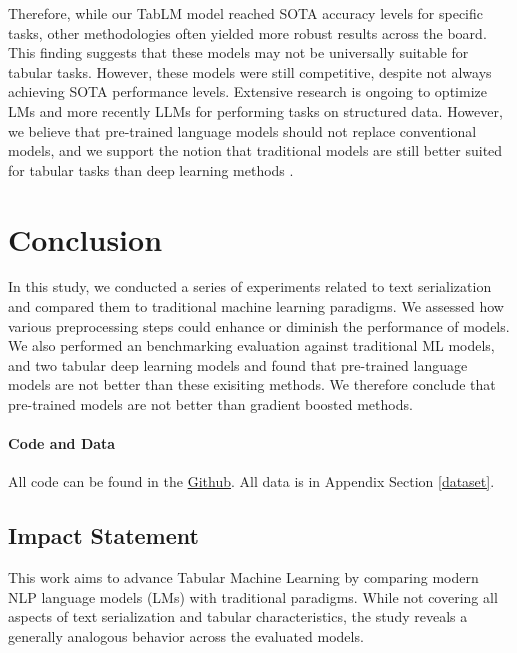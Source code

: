 \documentclass{article}
\theoremstyle{plain}
\theoremstyle{definition}
\theoremstyle{remark}
\begin{document}
Therefore, while our TabLM model reached SOTA accuracy levels for specific tasks, other methodologies often yielded more robust results across the board. This finding suggests that these models may not be universally suitable for tabular tasks. However, these models were still competitive, despite not always achieving SOTA performance levels. Extensive research is ongoing to optimize LMs and more recently LLMs for performing tasks on structured data. However, we believe that pre-trained language models should not replace conventional models, and we support the notion that traditional models are still better suited for tabular tasks than deep learning methods \citep{grinsztajn2022tree}.

\section{Conclusion}

In this study, we conducted a series of experiments related to text serialization and compared them to traditional machine learning paradigms. We assessed how various preprocessing steps could enhance or diminish the performance of models. We also performed an benchmarking evaluation against traditional ML models, and two tabular deep learning models and found that pre-trained language models are not better than these exisiting methods. We therefore conclude that pre-trained models are not better than gradient boosted methods.

\paragraph{Code and Data} All code can be found in the \href{https://github.com/Simonlee711/Serialization_SOTA}{Github}. All data is in Appendix Section \ref{dataset}.

\subsection{Impact Statement}

This work aims to advance Tabular Machine Learning by comparing modern NLP language models (LMs) with traditional paradigms. While not covering all aspects of text serialization and tabular characteristics, the study reveals a generally analogous behavior across the evaluated models.
\end{document}
